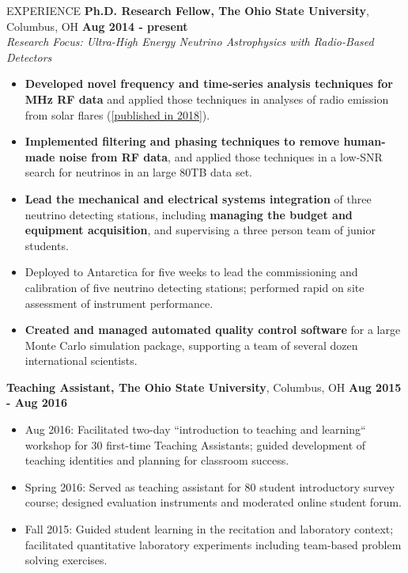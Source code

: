 \documentclass{resume} %
\begin{document}
\begin{rSection}{EXPERIENCE}
{\bf Ph.D. Research Fellow, The Ohio State University}, Columbus, OH \hfill {\bf Aug 2014 - present}\\
{\em Research Focus: Ultra-High Energy Neutrino Astrophysics with Radio-Based Detectors}
\begin{itemize}
\vspace*{.05in}
\item {\bf Developed novel frequency and time-series analysis techniques for MHz RF data} and applied those techniques in analyses of radio emission from solar flares (\href{https://arxiv.org/abs/1807.03335}{[published in 2018]}).
\item {\bf Implemented filtering and phasing techniques to remove human-made noise from RF data}, and applied those techniques in a low-SNR search for neutrinos in an large 80TB data set. 
\item {\bf Lead the mechanical and electrical systems integration} of three neutrino detecting stations, including {\bf managing the budget and equipment acquisition}, and supervising a three person team of junior students.
\item Deployed to Antarctica for five weeks to lead the commissioning and calibration of five neutrino detecting stations; performed rapid on site assessment of instrument performance.
\item {\bf Created and managed automated quality control software} for a large Monte Carlo simulation package, supporting a team of several dozen international scientists.
\end{itemize}

{\bf Teaching Assistant, The Ohio State University}, Columbus, OH \hfill {\bf Aug 2015 - Aug 2016}
\begin{itemize}
\item Aug 2016: Facilitated two-day ``introduction to teaching and learning`` workshop for 30 first-time Teaching Assistants; guided development of teaching identities and planning for classroom success.
\item Spring 2016: Served as teaching assistant for 80 student introductory survey course; designed evaluation instruments and moderated online student forum.
\item Fall 2015: Guided student learning in the recitation and laboratory context; facilitated quantitative laboratory experiments including team-based problem solving exercises.

\end{itemize}

\end{rSection}
\end{document}
